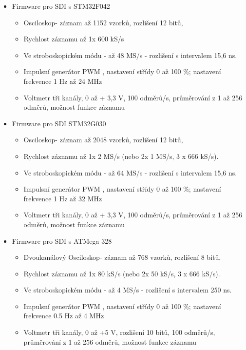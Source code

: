 \begin{itemize}
	\item Firmware pro SDI s STM32F042
	\begin{itemize}
		\item Osciloskop- záznam až 1152 vzorků, rozlišení 12 bitů,
		\item Rychlost záznamu až 1x 600 kS/s 
		\item Ve stroboskopickém módu - až  48 MS/s - rozlišení s intervalem 15,6 ns.
		\item Impulsní generátor PWM , nastavení  střídy 0 až 100 \%; nastavení frekvence 1 Hz až 24 MHz
		\item Voltmetr tři kanály, 0 až + 3,3 V, 100 odměrů/s, průměrování z 1 až 256 odměrů, možnost funkce záznamu
	\end{itemize}
	\item Firmware pro SDI STM32G030
	\begin{itemize}
		\item Osciloskop- záznam až 2048 vzorků, rozlišení 12 bitů,
		\item Rychlost záznamu až 1x 2 MS/s (nebo  2x 1 MS/s, 3 x 666 kS/s).
		\item Ve stroboskopickém módu - až  64 MS/s - rozlišení s intervalem 15,6 ns.
		\item Impulsní generátor PWM , nastavení  střídy 0 až 100 \%; nastavení frekvence 1 Hz až 32 MHz
		\item Voltmetr tři kanály, 0 až + 3,3 V, 100 odměrů/s, průměrování z 1 až 256 odměrů, možnost funkce záznamu
	\end{itemize}
	\item Firmware pro SDI s ATMega 328
			\begin{itemize}
		\item Dvoukanálový Osciloskop- záznam až 768 vzorků, rozlišení 8 bitů,
		\item Rychlost záznamu až 1x 80 kS/s (nebo  2x 50 kS/s, 3 x 666 kS/s).
		\item Ve stroboskopickém módu - až  4 MS/s - rozlišení s intervalem 250 ns.
		\item Impulsní generátor PWM , nastavení  střídy 0 až 100 \%; nastavení frekvence 0.5 Hz až 4 MHz
		\item Voltmetr tři kanály, 0 až +5 V, rozlišení 10 bitů, 100 odměrů/s, průměrování z 1 až 256 odměrů, možnost funkce záznamu
	\end{itemize}
	
\end{itemize}

